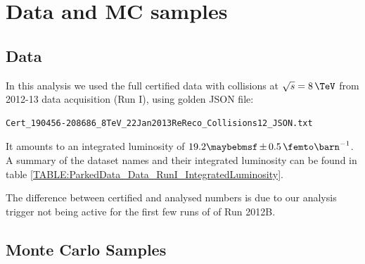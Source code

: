 \section{Data and MC samples}



\cite{ARTICLE:CMSLuminosityBasedonPixelClusterCounting}

\subsection{Data}


In this analysis we used the full certified data with collisions at $\sqrt{s}=8\,\TeV$ from 2012-13 data acquisition (Run I), using golden \gls{JSON} file:

\begin{verbatim}
Cert_190456-208686_8TeV_22Jan2013ReReco_Collisions12_JSON.txt
\end{verbatim}

It amounts to an integrated luminosity of $19.2 \pm 0.5 \,\femto\barn^{-1}$. A summary of the dataset names and their integrated luminosity can be found in table \ref{TABLE:ParkedData_Data_RunI_IntegratedLuminosity}.



The difference between certified and analysed numbers is due to our analysis trigger not being active for the first few runs of of Run 2012B.

\subsection{Monte Carlo Samples}

